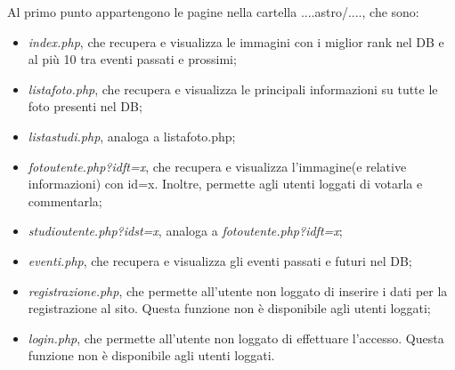 	Al primo punto appartengono le pagine nella cartella ....astro/...., che sono:
	\begin{itemize}
	\item \textit{index.php}, che recupera e visualizza le immagini con i miglior rank nel DB e al più 10 tra eventi passati e prossimi;
	\item \textit{listafoto.php}, che recupera e visualizza le principali informazioni su tutte le foto presenti nel DB;
	\item \textit{listastudi.php}, analoga a listafoto.php;
	\item \textit{fotoutente.php?idft=x}, che recupera e visualizza l'immagine(e relative informazioni) con id=x. Inoltre, permette agli utenti loggati di votarla e commentarla;
	\item \textit{studioutente.php?idst=x}, analoga a \textit{fotoutente.php?idft=x};
	\item \textit{eventi.php}, che recupera e visualizza gli eventi passati e futuri nel DB;
	\item \textit{registrazione.php}, che permette all'utente non loggato di inserire i dati per la registrazione al sito. Questa funzione non è disponibile agli utenti loggati;
	\item \textit{login.php}, che permette all'utente non loggato di effettuare l'accesso. Questa funzione non è disponibile agli utenti loggati.
	\end{itemize}
	
